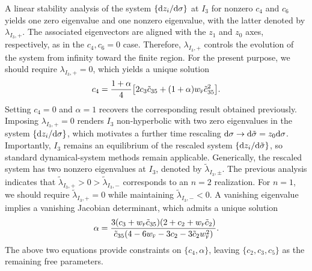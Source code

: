 \documentclass[aps,prd,twocolumn]{revtex4-2}
\newcommand\dx{{\rm d}}
\newcommand\subF{\textsc{f}}
\begin{document}
A linear stability analysis of the system $\{\dx z_i/\dx\sigma\}$ at $I_3$ for nonzero $c_4$ and $c_6$ yields one zero eigenvalue and one nonzero eigenvalue, with the latter denoted by $\lambda_{I_3,+}$. The associated eigenvectors are aligned with the $z_1$ and $z_0$ axes, respectively, as in the $c_4,c_6=0$ case. Therefore, $\lambda_{I_3,+}$ controls the evolution of the system from infinity toward the finite region. For the present purpose, we should require $\lambda_{I_3,+}=0$, which yields a unique solution
\begin{equation}\label{eq:3.41}
  c_4 = \frac{1+\alpha}{4} \big[2c_3\tilde{c}_{35} + (1+\alpha)w_\subF \tilde{c}_{35}^2\big].
\end{equation}
Setting $c_4=0$ and $\alpha=1$ recovers the corresponding result obtained previously. Imposing $\lambda_{I_3,+}=0$ renders $I_3$ non-hyperbolic with two zero eigenvalues in the system $\{\dx z_i/\dx\sigma\}$, which motivates a further time rescaling $\dx\sigma\rightarrow\dx\tilde{\sigma}=z_0\dx\sigma$. Importantly, $I_3$ remains an equilibrium of the rescaled system $\{\dx z_i/\dx\tilde{\sigma}\}$, so standard dynamical-system methods remain applicable. Generically, the rescaled system has two nonzero eigenvalues at $I_3$, denoted by $\tilde{\lambda}_{I_3,\pm}$. The previous analysis indicates that $\tilde{\lambda}_{I_3,+}>0>\tilde{\lambda}_{I_3,-}$ corresponds to an $n=2$ realization. For $n=1$, we should require $\tilde{\lambda}_{I_3,+}=0$ while maintaining $\tilde{\lambda}_{I_3,-}<0$. A vanishing eigenvalue implies a vanishing Jacobian determinant, which admits a unique solution
\begin{equation}\label{eq:3.42}
  \alpha = \frac{3 (c_3 + w_\subF \tilde{c}_{35}) (2+c_2+w_\subF\tilde{c}_2)}{\tilde{c}_{35} (4 - 6 w_\subF  - 3 c_2 - 3\tilde{c}_2w_\subF^2)}.
\end{equation}
The above two equations provide constraints on $\{c_4,\alpha\}$, leaving $\{c_2,c_3,c_5\}$ as the remaining free parameters.
\end{document}

